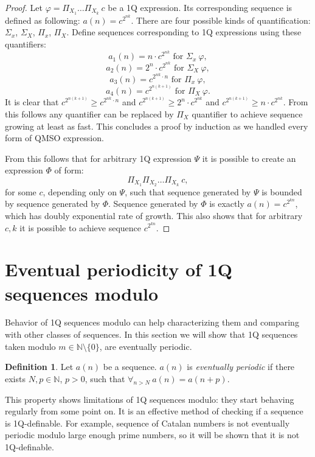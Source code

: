 \documentclass[12pt]{article}
\theoremstyle{definition}
\newtheorem{definition}{Definition}[section]
\begin{document}
\begin{proof}
    Let $\varphi = \Pi_{X_1}\ldots \Pi_{X_k} \ c$ be a 1Q expression. Its corresponding sequence is defined as following: $a(n) = c^{2^{nk}}$. There are four possible kinds of quantification: $\Sigma_x$, $\Sigma_X$, $\Pi_x$, $\Pi_X$. Define sequences corresponding to 1Q expressions using these quantifiers:
    $$a_1(n) = n \cdot c^{2^{nk}} \text{ for } \Sigma_x \ \varphi,$$
    $$a_2(n) = 2^n \cdot c^{2^{nk}} \text{ for } \Sigma_X \ \varphi,$$
    $$a_3(n) = c^{2^{nk} \cdot n} \text{ for } \Pi_x \ \varphi,$$
    $$a_4(n) = c^{2^{n(k+1)}} \text{ for } \Pi_X \ \varphi.$$
    It is clear that $c^{2^{n(k+1)}} \geq c^{2^{nk} \cdot n}$ and $c^{2^{n(k+1)}} \geq 2^n \cdot c^{2^{nk}}$ and $c^{2^{n(k+1)}} \geq n \cdot c^{2^{nk}}$. From this follows any quantifier can be replaced by $\Pi_X$ quantifier to achieve sequence growing at least as fast. This concludes a proof by induction as we handled every form of QMSO expression.

    From this follows that for arbitrary 1Q expression $\varPsi$ it is possible to create an expression $\varPhi$ of form:
    $$\Pi_{X_1}\Pi_{X_2}\ldots \Pi_{X_k} \ c,$$
    for some $c$, depending only on $\varPsi$, such that sequence generated by $\varPsi$ is bounded by sequence generated by $\varPhi$. Sequence generated by $\varPhi$ is exactly $a(n) = c^{2^{kn}}$, which has doubly exponential rate of growth. This also shows that for arbitrary $c, k$ it is possible to achieve sequence $c^{2^{kn}}$.
\end{proof}

\section{Eventual periodicity of 1Q sequences modulo}
\label{Sec1QFiniteSemirings}
Behavior of 1Q sequences modulo can help characterizing them and comparing with other classes of sequences. In this section we will show that 1Q sequences taken modulo $m \in \mathbb{N} \setminus \{0\}$, are eventually periodic.

\begin{definition}
    Let $a(n)$ be a sequence. $a(n)$ is \textit{eventually periodic} if there exists $N, p \in \mathbb{N}$, $p > 0$, such that $\forall_{n > N} \ a(n) = a(n+p)$.
\end{definition}

This property shows limitations of 1Q sequences modulo: they start behaving regularly from some point on. It is an effective method of checking if a sequence is 1Q-definable. For example, sequence of Catalan numbers is not eventually periodic modulo large enough prime numbers, so it will be shown that it is not 1Q-definable. 
\end{document}
